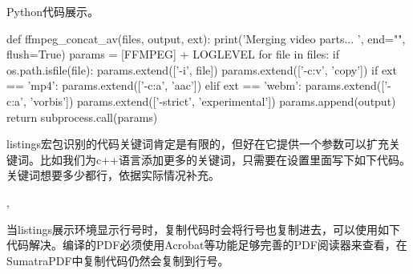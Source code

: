 Python代码展示。

\begin{python}{}
def ffmpeg_concat_av(files, output, ext):
    print('Merging video parts... ', end="", flush=True)
    params = [FFMPEG] + LOGLEVEL
    for file in files:
        if os.path.isfile(file): params.extend(['-i', file])
    params.extend(['-c:v', 'copy'])
    if ext == 'mp4':
        params.extend(['-c:a', 'aac'])
    elif ext == 'webm':
        params.extend(['-c:a', 'vorbis'])
    params.extend(['-strict', 'experimental'])
    params.append(output)
    return subprocess.call(params)
\end{python}

listings宏包识别的代码关键词肯定是有限的，但好在它提供一个参数可以扩充关键词。比如我们为c++语言添加更多的关键词，只需要在设置里面写下如下代码。关键词想要多少都行，依据实际情况补充。

\begin{latex}
,
\end{latex}

当listings展示环境显示行号时，复制代码时会将行号也复制进去，可以使用如下代码解决。编译的PDF必须使用Acrobat等功能足够完善的PDF阅读器来查看，在SumatraPDF中复制代码仍然会复制到行号。

\begin{latex}
\usepackage{accsupp}
\newcommand{\emptyaccsupp}[1]{\BeginAccSupp{ActualText={}}#1\EndAccSupp{}}
\lstset{%
numberstyle=\small\ttfamily\emptyaccsupp,}
\end{latex}

